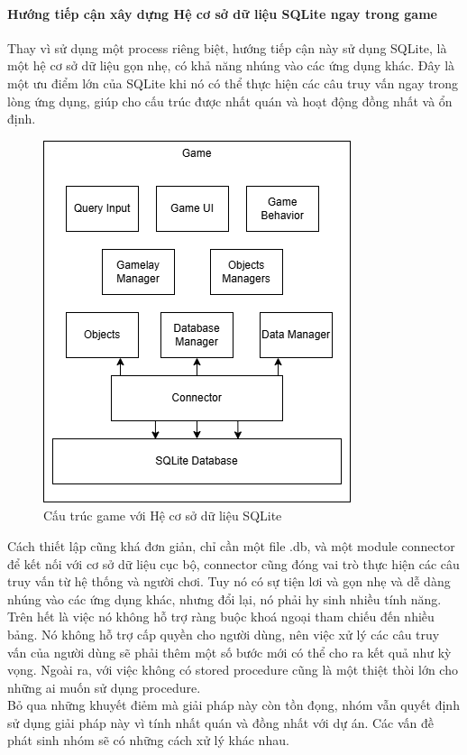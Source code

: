 \paragraph {Hướng tiếp cận xây dựng Hệ cơ sở dữ liệu SQLite ngay trong game}
\hspace*{0.5cm} Thay vì sử dụng một process riêng biệt, hướng tiếp cận này sử dụng SQLite, là một hệ cơ sở dữ liệu gọn nhẹ, có khả năng nhúng vào các ứng dụng khác. Đây là một ưu điểm lớn của SQLite khi nó có thể thực hiện các câu truy vấn ngay trong lòng ứng dụng, giúp cho cấu trúc được nhất quán và hoạt động đồng nhất và ổn định.
\begin{figure}[H]
	\centering
	\includegraphics[width=\textwidth]{Images/SQLITE.png}
	\vspace{0.5cm}
	\caption{Cấu trúc game với Hệ cơ sở dữ liệu SQLite}
\end{figure}
\hspace{0.5cm} Cách thiết lập cũng khá đơn giản, chỉ cần một file .db, và một module connector để kết nối với cơ sở dữ liệu cục bộ, connector cũng đóng vai trò thực hiện các câu truy vấn từ hệ thống và người chơi. 
\hspace*{0.5cm} Tuy nó có sự tiện lơi và gọn nhẹ và dễ dàng nhúng vào các ứng dụng khác, nhưng đổi lại, nó phải hy sinh nhiều tính năng. Trên hết là việc nó không hỗ trợ ràng buộc khoá ngoại tham chiếu đến nhiều bảng. Nó không hỗ trợ cấp quyền cho người dùng, nên việc xử lý các câu truy vấn của người dùng sẽ phải thêm một số bước mới có thể cho ra kết quả như kỳ vọng. Ngoài ra, với việc không có stored procedure cũng là một thiệt thòi lớn cho những ai muốn sử dụng procedure.\\
\hspace*{0.5cm} Bỏ qua những khuyết điẻm mà giải pháp này còn tồn đọng, nhóm vẫn quyết định sử dụng giải pháp này vì tính nhất quán và đồng nhất với dự án. Các vấn đề phát sinh nhóm sẽ có những cách xử lý khác nhau.
